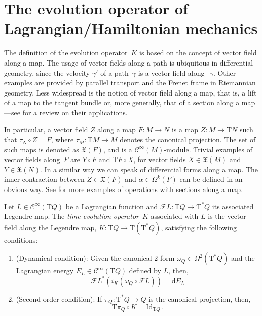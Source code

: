 \documentclass[11pt]{article}
\theoremstyle{plain}
\theoremstyle{definition}
\renewcommand{\d}{\mathrm{d}}
\newcommand{\df}{\Omega}
\newcommand{\Cinfty}{\mathscr{C}^\infty}
\newcommand{\T}{{\mathrm T}}
\let\Tan\T
\newcommand{\cT}{\T^{\ast}}
\newcommand{\Id}{\mathrm{Id}}
\newcommand{\vf}{\mathfrak{X}}
\newcommand{\F}{\mathcal{F}}
\def\d{\mathrm{d}}
\def\d{\mathrm{d}}
\def\Tan{\mathrm{T}}
\def\FL{\mathcal{F} L}
\begin{document}
\section{The evolution operator of Lagrangian/Hamiltonian mechanics}
\label{Kopsymp}

The definition of the evolution operator~$K$ 
is based on the concept of vector field along a map.
The usage of vector fields along a path is ubiquitous in differential geometry, 
since the velocity $\gamma'$ of a path~$\gamma$ is a vector field along~$~\gamma$.
Other examples are provided by parallel transport and the Frenet frame in Riemannian geometry.
Less widespread is the notion of vector field along a map,
that is, a lift of a map to the tangent bundle
\cite[section 8.6]{Bou_Var}
\cite[p.\,376]{KMS_93}
or, more generally, that of 
a section along a map
\cite[p.\,36]{Poo_81}
---see
\cite{Car_96}
for a review on their applications. 

In particular, a vector field $Z$ along a map
$F\colon M \to N$
is a map $Z \colon M \to\T N$ such that 
$\tau_N \circ Z = F$,
where $\tau_M \colon \Tan M \to M$ denotes the canonical projection. 
The set of such maps is denoted as $\vf(F)$,
and is a
$\Cinfty(M)$-module. 
Trivial examples of vector fields along~$F$ are 
$Y \circ F$ and $\T F \circ X$,
for vector fields $X \in \vf(M)$ and $Y \in \vf(N)$.
In a similar way we can speak of differential forms along a map.
The inner contraction between 
$Z \in \vf(F)$ and
$\alpha \in \df^k(F)$
can be defined in an obvious way.
See 
\cite{CLM_89}
for more examples of operations with sections along a map.


Let $L\in\Cinfty(\T Q)$ be a Lagrangian function and
$\F L\colon\T Q\to\cT Q$ its
associated Legendre map.
The \textsl{time-evolution operator}~$K$
associated with $L$ is the vector field along the Legendre map, 
$K \colon \T Q \to\T(\cT Q)$, 
satisfying the following conditions:
\begin{enumerate}
\item
(Dynamical condition):
Given the canonical $2$-form $\omega_Q\in\Omega^2(\cT Q)$ and the Lagrangian energy $E_L\in\Cinfty(\T Q)$ defined by $L$, then,
$$ \FL^* (i_K(\omega_Q \circ \FL))= \d E_L $$
\item\label{item_2} 
(Second-order condition): 
If $\pi_Q\colon\cT Q \to Q$ is the canonical projection, then,
$$ \T\pi_Q \circ K = \Id_{\T Q}\,. $$
\end{enumerate}
\end{document}
